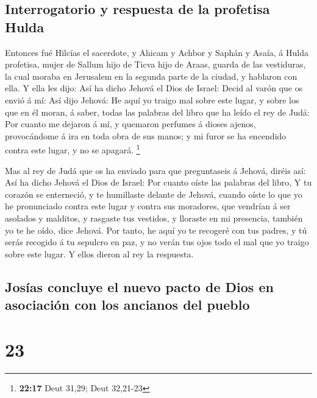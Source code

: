 \hypertarget{interrogatorio-y-respuesta-de-la-profetisa-hulda}{%
\subsection{Interrogatorio y respuesta de la profetisa
Hulda}\label{interrogatorio-y-respuesta-de-la-profetisa-hulda}}

 Entonces fué Hilcías el sacerdote, y Ahicam y Achbor y
Saphán y Asaía, á Hulda profetisa, mujer de Sallum hijo de Ticva hijo de
Araas, guarda de las vestiduras, la cual moraba en Jerusalem en la
segunda parte de la ciudad, y hablaron con ella.  Y ella
les dijo: Así ha dicho Jehová el Dios de Israel: Decid al varón que os
envió á mí:  Así dijo Jehová: He aquí yo traigo mal sobre
este lugar, y sobre los que en él moran, á saber, todas las palabras del
libro que ha leído el rey de Judá:  Por cuanto me dejaron á
mí, y quemaron perfumes á dioses ajenos, provocándome á ira en toda obra
de sus manos; y mi furor se ha encendido contra este lugar, y no se
apagará. \footnote{\textbf{22:17} Deut 31,29; Deut 32,21-23}

 Mas al rey de Judá que os ha enviado para que preguntaseis
á Jehová, diréis así: Así ha dicho Jehová el Dios de Israel: Por cuanto
oíste las palabras del libro,  Y tu corazón se enterneció,
y te humillaste delante de Jehová, cuando oíste lo que yo he pronunciado
contra este lugar y contra sus moradores, que vendrían á ser asolados y
malditos, y rasgaste tus vestidos, y lloraste en mi presencia, también
yo te he oído, dice Jehová.  Por tanto, he aquí yo te
recogeré con tus padres, y tú serás recogido á tu sepulcro en paz, y no
verán tus ojos todo el mal que yo traigo sobre este lugar. Y ellos
dieron al rey la respuesta.

\hypertarget{josuxedas-concluye-el-nuevo-pacto-de-dios-en-asociaciuxf3n-con-los-ancianos-del-pueblo}{%
\subsection{Josías concluye el nuevo pacto de Dios en asociación con los
ancianos del
pueblo}\label{josuxedas-concluye-el-nuevo-pacto-de-dios-en-asociaciuxf3n-con-los-ancianos-del-pueblo}}

\hypertarget{section-22}{%
\section{23}\label{section-22}}

